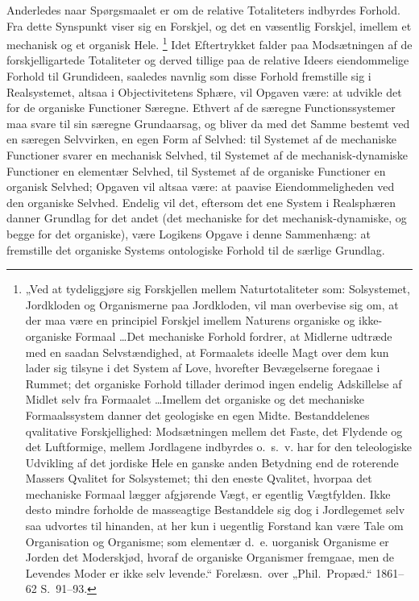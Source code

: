 \documentclass[12pt]{book}
\newcommand{\opage}[1]{\marginnote{\footnotesize\textit{[#1]}}}
\begin{document}
Anderledes naar Spørgsmaalet er om de relative Totaliteters indbyrdes Forhold. Fra dette
Synspunkt viser sig en Forskjel, og det en væsentlig Forskjel, imellem et mechanisk og et
organisk Hele.%
\footnote{„Ved at tydeliggjøre sig Forskjellen mellem Naturtotaliteter som: Solsystemet,
  Jordkloden og Organismerne paa Jordkloden, vil man overbevise sig om, at der maa være en
  principiel Forskjel imellem Naturens organiske og ikke-organiske Formaal \ldots Det mechaniske
  Forhold fordrer, at Midlerne udtræde med en saadan Selvstændighed, at Formaalets ideelle Magt
  over dem kun lader sig tilsyne i det System af Love, hvorefter Bevægelserne foregaae i Rummet;
  det organiske Forhold tillader derimod ingen endelig Adskillelse af Midlet selv fra Formaalet
  \ldots Imellem det organiske og det mechaniske Formaalssystem danner det geologiske en egen
  Midte. Bestanddelenes qvalitative Forskjellighed: Modsætningen mellem det Faste, det Flydende
  og det Luftformige, mellem Jordlagene indbyrdes o.\ s.\ v. har for den teleologiske Udvikling
  af det jordiske Hele en ganske anden Betydning end de roterende Massers Qvalitet for
  Solsystemet; thi den eneste Qvalitet, hvorpaa det mechaniske Formaal lægger afgjørende Vægt, er
  egentlig Vægtfylden. Ikke desto mindre forholde de masseagtige Bestanddele sig dog i
  Jordlegemet selv saa udvortes til hinanden, at her kun i uegentlig Forstand kan være Tale om
  Organisation og Organisme; som elementær d.\ e. uorganisk Organisme er Jorden det Moderskjød,
  hvoraf de organiske Organismer fremgaae, men de Levendes Moder er ikke selv levende.“
  Forelæsn.\ over „Phil.\ Propæd.“ 1861--62 S.~91--93.}
Idet Eftertrykket falder paa Modsætningen af de forskjelligartede Totaliteter og derved tillige
paa de relative Ideers eiendommelige Forhold til Grundideen, saaledes navnlig som disse Forhold
fremstille sig i Realsystemet, altsaa i Objectivitetens Sphære, vil Opgaven være: at udvikle det
for de organiske Functioner Særegne.
\opage{401} Ethvert af de særegne Functionssystemer maa svare til sin særegne Grundaarsag, og bliver da med
det Samme bestemt ved en særegen Selvvirken, en egen Form af Selvhed: til Systemet af de
mechaniske Functioner svarer en mechanisk Selvhed, til Systemet af de mechanisk-dynamiske
Functioner en elementær Selvhed, til Systemet af de organiske Functioner en organisk Selvhed;
Opgaven vil altsaa være: at paavise Eiendommeligheden ved den organiske Selvhed. Endelig vil
det, eftersom det ene System i Realsphæren danner Grundlag for det andet (det mechaniske for det
mechanisk-dynamiske, og begge for det organiske), være Logikens Opgave i denne Sammenhæng: at
fremstille det organiske Systems ontologiske Forhold til de særlige Grundlag.
\end{document}
